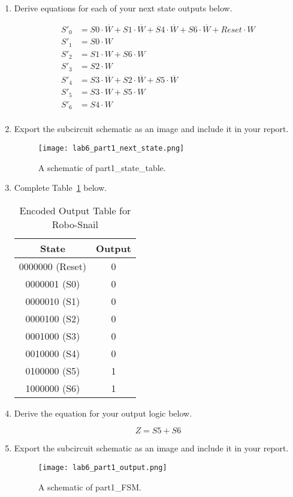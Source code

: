 \documentclass{article}
\begin{document}
\begin{enumerate}
\item Derive equations for each of your next state outputs below.

\begin{align*}
    S'_0 &= S0 \cdot \overline{W} + S1 \cdot \overline{W} + S4 \cdot \overline{W} + S6 \cdot \overline{W} + Reset \cdot W\\
    S'_1 &= S0 \cdot W \\
    S'_2 &= S1 \cdot W + S6 \cdot W\\
    S'_3 &= S2 \cdot W \\
    S'_4 &= S3 \cdot \overline{W} + S2 \cdot \overline{W} + S5 \cdot \overline{W} \\
    S'_5 &= S3 \cdot W + S5 \cdot W \\
    S'_6 &= S4 \cdot W \\
\end{align*}

\item Export the subcircuit schematic as an image and include it in your report.

\begin{figure}[ht!]
    \centering
    \texttt{[image: lab6\_part1\_next\_state.png]}
    \caption{A schematic of part1\_state\_table.}
    \label{f:part1_state_table}
\end{figure}

\item Complete Table~\ref{t:part1_output_table} below.

\begin{table}[ht!]
\caption{Encoded Output Table for Robo-Snail}
\label{t:part1_output_table}
\centering
\begin{tabular}{|c|c|}
\hline
State   & Output \\ \hline
0000000 (Reset) & 0 \\ \hline
0000001 (S0)   & 0 \\ \hline
0000010 (S1)   & 0 \\ \hline
0000100 (S2)   & 0 \\ \hline
0001000 (S3)   & 0 \\ \hline
0010000 (S4)   & 0 \\ \hline
0100000 (S5)   & 1 \\ \hline
1000000 (S6)   & 1 \\ \hline
\end{tabular}
\end{table}

\item Derive the equation for your output logic below.

$$Z = S5 + S6$$

\item Export the subcircuit schematic as an image and include it in your report.

\begin{figure}[ht!]
    \centering
    \texttt{[image: lab6\_part1\_output.png]}
    \caption{A schematic of part1\_FSM.}
    \label{f:part1_FSM}
\end{figure}
\end{enumerate}
\end{document}
